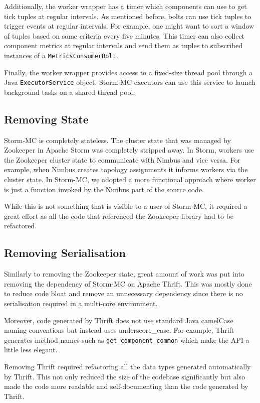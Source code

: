 \documentclass[bsc,deptreport,twoside,singlespacing,normalheadings,parskip]{infthesis}\usepackage[]{graphicx}\usepackage[]{color}
\begin{document}
Additionally, the worker wrapper has a timer which components can use to get tick tuples at regular intervals. As mentioned before, bolts can use tick tuples to trigger events at regular intervals. For example, one might want to sort a window of tuples based on some criteria every five minutes. This timer can also collect component metrics at regular intervals and send them as tuples to subscribed instances of a \texttt{MetricsConsumerBolt}.

Finally, the worker wrapper provides access to a fixed-size thread pool through a Java \texttt{ExecutorService} object. Storm-MC executors can use this service to launch background tasks on a shared thread pool.

\subsection{Removing State}

Storm-MC is completely stateless. The cluster state that was managed by Zookeeper in Apache Storm was completely stripped away. In Storm, workers use the Zookeeper cluster state to communicate with Nimbus and vice versa. For example, when Nimbus creates topology assignments it informs workers via the cluster state. In Storm-MC, we adopted a more functional approach where worker is just a function invoked by the Nimbus part of the source code.

While this is not something that is visible to a user of Storm-MC, it required a great effort as all the code that referenced the Zookeeper library had to be refactored.

\subsection{Removing Serialisation}

Similarly to removing the Zookeeper state, great amount of work was put into removing the dependency of Storm-MC on Apache Thrift. This was mostly done to reduce code bloat and remove an unnecessary dependency since there is no serialisation required in a multi-core environment.

Moreover, code generated by Thrift does not use standard Java camelCase naming conventions but instead uses underscore\_case. For example, Thrift generates method names such as \texttt{get\_component\_common} which make the API a little less elegant.

Removing Thrift required refactoring all the data types generated automatically by Thrift. This not only reduced the size of the codebase significantly but also made the code more readable and self-documenting than the code generated by Thrift.
\end{document}
